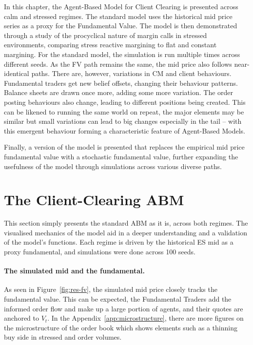 In this chapter, the Agent-Based Model for Client Clearing is presented across calm and stressed regimes. The standard model uses the historical mid price series as a proxy for the Fundamental Value. The model is then demonstrated through a study of the procyclical nature of margin calls in stressed environments, comparing stress reactive margining to flat and constant margining. For the standard model, the simulation is run multiple times across different seeds. As the FV path remains the same, the mid price also follows near-identical paths. There are, however, variations in CM and client behaviours. Fundamental traders get new belief offsets, changing their behaviour patterns. Balance sheets are drawn once more, adding some more variation. The order posting behaviours also change, leading to different positions being created. This can be likened to running the same world on repeat, the major elements may be similar but small variations can lead to big changes especially in the tail -- with this emergent behaviour forming a characteristic feature of Agent-Based Models. 

Finally, a version of the model is presented that replaces the empirical mid price fundamental value with a stochastic fundamental value, further expanding the usefulness of the model through simulations across various diverse paths. 


\section{The Client-Clearing ABM}\label{sec:res-general}

This section simply presents the standard ABM as it is, across both regimes. The visualised mechanics of the model aid in a deeper understanding and a validation of the model's functions.  Each regime is driven by the historical ES mid as a proxy fundamental, and simulations were done across 100 seeds.

\paragraph{The simulated mid and the fundamental.} As seen in Figure~\ref{fig:res-fv}, the simulated mid price closely tracks the fundamental value. This can be expected, the Fundamental Traders add the informed order flow and make up a large portion of agents, and their quotes are anchored to $V_t$. In the Appendix~\ref{app:microstructure}, there are more figures on the microstructure of the order book which shows elements such as a thinning buy side in stressed and order volumes.

